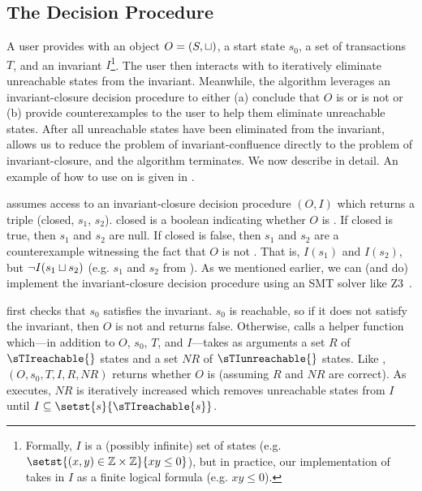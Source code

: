 \subsection{The Decision Procedure}
A user provides  with an object $O = (S,
\sqcup)$, a start state $s_0$, a set of transactions $T$, and an invariant
$I$\footnote{%
  Formally, $I$ is a (possibly infinite) set of states (e.g. $\setst{(x, y) \in
  \ints \times \ints}{xy \leq 0}$), but in practice, our implementation of
  \IsInvConfluent{} takes in $I$ as a finite logical formula (e.g. $xy \leq
  0$).
}. The user then interacts with
 to iteratively eliminate unreachable
states from the invariant. Meanwhile, the algorithm leverages an
invariant-closure decision procedure to either (a) conclude that $O$ is or is
not \sTIconfluent{} or (b) provide counterexamples to the user to help them
eliminate unreachable states. After all unreachable states have been eliminated
from the invariant,  allows us to reduce
the problem of invariant-confluence directly to the problem of
invariant-closure, and the algorithm terminates.
%
We now describe  in detail. An example of
how to use  on  is given
in .

\IsInvConfluent{} assumes access to an invariant-closure decision procedure
\IsIclosed$(O, I)$ which returns a triple (closed, $s_1$, $s_2$). closed is a
boolean indicating whether $O$ is \Iclosed{}. If closed is true, then $s_1$ and
$s_2$ are null. If closed is false, then $s_1$ and $s_2$ are a counterexample
witnessing the fact that $O$ is not \Iclosed{}. That is, $I(s_1)$ and $I(s_2)$,
but $\lnot I(s_1 \sqcup s_2)$ (e.g. $s_1$ and $s_2$ from ).  As
we mentioned earlier, we can (and do) implement the invariant-closure decision
procedure using an SMT solver like Z3~\cite{de2008z3}.

\IsInvConfluent{} first checks that $s_0$ satisfies the invariant. $s_0$ is
reachable, so if it does not satisfy the invariant, then $O$ is not
\sTIconfluent{} and \IsInvConfluent{} returns false. Otherwise,
\IsInvConfluent{} calls a helper function \Helper{} which---in addition to $O$,
$s_0$, $T$, and $I$---takes as arguments a set $R$ of $\sTIreachable{}$ states
and a set $NR$ of $\sTIunreachable{}$ states. Like \IsInvConfluent, \Helper$(O,
s_0, T, I, R, NR)$ returns whether $O$ is \sTIconfluent{} (assuming $R$ and
$NR$ are correct).  As  executes, $NR$ is
iteratively increased which removes unreachable states from $I$ until $I
\subseteq \setst{s}{\sTIreachable{s}}$.

